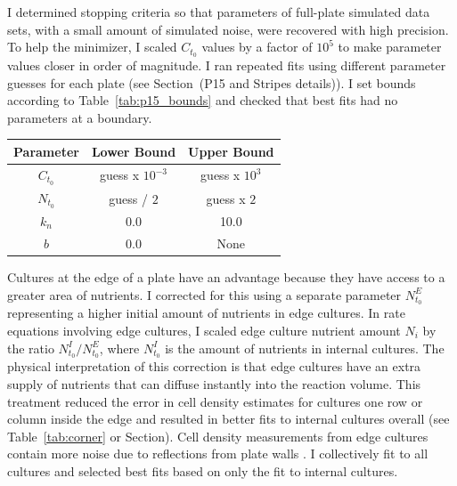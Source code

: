 I determined stopping criteria so that parameters of full-plate
simulated data sets, with a small amount of simulated noise, were
recovered with high precision. To help the minimizer, I scaled
\(C_{t_{0}}\) values by a factor of \(10^{5}\) to make parameter
values closer in order of magnitude. I ran repeated fits using
different parameter guesses for each plate (see Section~(P15 and
Stripes details)). I set bounds according to
Table~\ref{tab:p15_bounds} and checked that best fits had no
parameters at a boundary.
%
\columnbreak
\begin{center}
  \begin{tabular}{| c | c c |}
    \hline
    Parameter        & Lower Bound  & Upper Bound \\
    \hline
    \(C_{t_{0}}\)     & guess x \(10^{-3}\)  & guess x \(10^{3}\)\\
    \(N_{t_{0}}\)     & guess / \(2\)  & guess x \(2\)\\
    \(k_{n}\)        & 0.0    & 10.0\\
    \(b\)           & 0.0    & None \\
    \hline
  \end{tabular}
  \label{tab:p15_bounds}
\end{center}
%
Cultures at the edge of a plate have an advantage because they have
access to a greater area of nutrients. I corrected for this using a
separate parameter \(N^{E}_{t_{0}}\) representing a higher initial
amount of nutrients in edge cultures. In rate equations involving edge
cultures, I scaled edge culture nutrient amount \(N_{i}\) by the ratio
\(N^{I}_{t_{0}}/N^{E}_{t_{0}}\), where \(N^{I}_{t_{0}}\) is the amount
of nutrients in internal cultures. The physical interpretation of this
correction is that edge cultures have an extra supply of nutrients
that can diffuse instantly into the reaction volume. This treatment
reduced the error in cell density estimates for cultures one row or
column inside the edge and resulted in better fits to internal
cultures overall (see Table~\ref{tab:corner} or Section). Cell density
measurements from edge cultures contain more noise due to reflections
from plate walls \citep{Lawless2010}. I collectively fit to all
cultures and selected best fits based on only the fit to internal
cultures.

